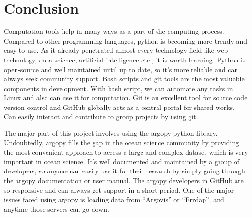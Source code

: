 \section{Conclusion}

Computation tools help in many ways as a part of the computing process. Compared to other programming languages, python is becoming more trendy and easy to use. As it already penetrated almost every technology field like web technology, data science, artificial intelligence etc., it is worth learning. Python is open-source and well maintained until up to date, so it’s more reliable and can always seek community support. Bash scripts and git tools are the most valuable components in development. With bash script, we can automate any tasks in Linux and also can use it for computation. Git is an excellent tool for source code version control and GitHub globally acts as a central portal for shared works. Can easily interact and contribute to group projects by using git. \newline

\noindent The major part of this project involves using the argopy python library. Undoubtedly, argopy fills the gap in the ocean science community by providing the most convenient approach to access a large and complex dataset which is very important in ocean science. It’s well documented and maintained by a group of developers, so anyone can easily use it for their research by simply going through the argopy documentation or user manual. The argopy developers in GitHub are so responsive and can always get support in a short period. One of the major issues faced using argopy is loading data from “Argovis” or “Errdap”, and anytime those servers can go down.
\newpage